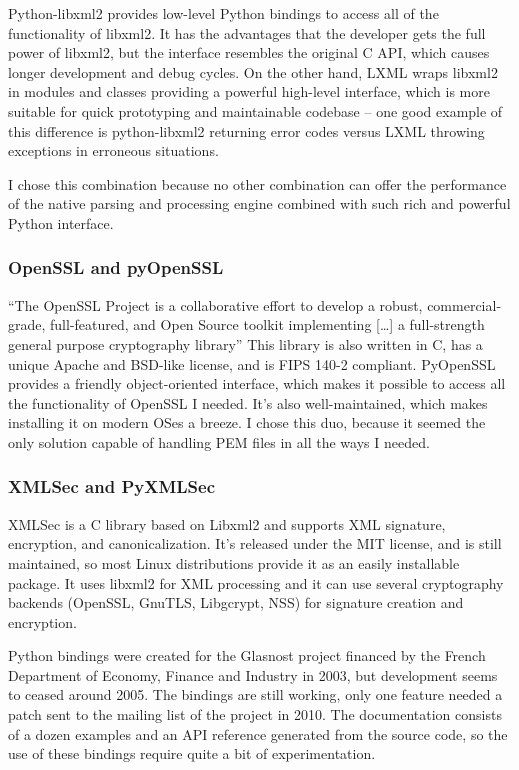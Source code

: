 \label{lxml}
Python-libxml2 provides low-level Python bindings to access all of the functionality of libxml2. It has the advantages that the developer gets the full power of libxml2, but the interface resembles the original C API, which causes longer development and debug cycles. On the other hand, LXML\cite{lxml-homepage} wraps libxml2 in modules and classes providing a powerful high-level interface, which is more suitable for quick prototyping and maintainable codebase -- one good example of this difference is python-libxml2 returning error codes versus LXML throwing exceptions in erroneous situations.

I chose this combination because no other combination can offer the performance of the native parsing and processing engine combined with such rich and powerful Python interface.

\subsubsection{OpenSSL and pyOpenSSL}

``The OpenSSL Project is a collaborative effort to develop a robust, commercial-grade, full-featured, and Open Source toolkit implementing [\ldots] a full-strength general purpose cryptography library''\cite{openssl-homepage} This library is also written in C, has a unique Apache and BSD-like license, and is FIPS 140-2 compliant. PyOpenSSL provides a friendly object-oriented interface, which makes it possible to access all the functionality of OpenSSL I needed. It's also well-maintained, which makes installing it on modern OSes a breeze. I chose this duo, because it seemed the only solution capable of handling PEM files in all the ways I needed.

\subsubsection{XMLSec and PyXMLSec}

XMLSec is a C library based on Libxml2 and supports XML signature, encryption, and canonicalization.\cite{xmlsec-homepage} It's released under the MIT license, and is still maintained, so most Linux distributions provide it as an easily installable package. It uses libxml2 for XML processing and it can use several cryptography backends (OpenSSL, GnuTLS, Libgcrypt, NSS) for signature creation and encryption.

Python bindings were created for the Glasnost project financed by the French Department of Economy, Finance and Industry in 2003, but development seems to ceased around 2005. The bindings are still working, only one feature needed a patch sent to the mailing list of the project in 2010. The documentation consists of a dozen examples and an API reference generated from the source code, so the use of these bindings require quite a bit of experimentation.


